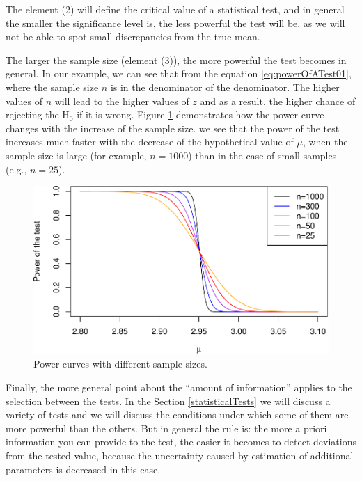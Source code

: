\documentclass[
]{book}
\theoremstyle{definition}
\theoremstyle{definition}
\theoremstyle{definition}
\theoremstyle{definition}
\theoremstyle{remark}
\begin{document}
The element (2) will define the critical value of a statistical test, and in general the smaller the significance level is, the less powerful the test will be, as we will not be able to spot small discrepancies from the true mean.

The larger the sample size (element (3)), the more powerful the test becomes in general. In our example, we can see that from the equation \eqref{eq:powerOfATest01}, where the sample size \(n\) is in the denominator of the denominator. The higher values of \(n\) will lead to the higher values of \(z\) and as a result, the higher chance of rejecting the H\(_0\) if it is wrong. Figure \ref{fig:powerCurves02} demonstrates how the power curve changes with the increase of the sample size. we see that the power of the test increases much faster with the decrease of the hypothetical value of \(\mu\), when the sample size is large (for example, \(n=1000\)) than in the case of small samples (e.g., \(n=25\)).

\begin{figure}
\centering
\includegraphics{Svetunkov---Statistics-for-Business-Analytics_files/figure-latex/powerCurves02-1.pdf}
\caption{\label{fig:powerCurves02}Power curves with different sample sizes.}
\end{figure}

Finally, the more general point about the ``amount of information'' applies to the selection between the tests. In the Section \ref{statisticalTests} we will discuss a variety of tests and we will discuss the conditions under which some of them are more powerful than the others. But in general the rule is: the more a priori information you can provide to the test, the easier it becomes to detect deviations from the tested value, because the uncertainty caused by estimation of additional parameters is decreased in this case.
\end{document}

